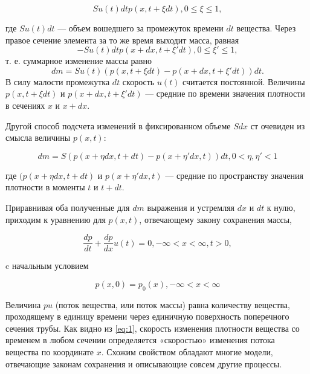 		
		\begin{equation}
		S u(t) dt p(x,t+ \xi dt), 0 \le  \xi  \le 1, 
		\end{equation}
		
		где $ S u(t) dt $ — объем вошедшего за 
		промежуток времени $ dt $ вещества. Через правое
		сечение элемента за то же время выходит масса, равная
		\begin{equation}
		 -Su(t)dtp(x+dx,t+\xi'dt), 0\le\xi'\le1,
		\end{equation}
		т. е. суммарное изменение массы равно
		\begin{equation}
		 dm = S u(t) (p(x,t+ \xi  dt)-p(x+dx,t+ \xi ' dt)) dt.
		\end{equation}
		В силу малости промежутка $ dt $ скорость $ u(t) $ считается постоянной. 
		Величины $ p(x,t+ \xi  dt) $ и $ p(x+dx,t+ \xi ' dt) $ — средние по времени значения
		плотности в сечениях $ x $ и $ x+dx $.
		
		Другой способ подсчета изменений в фиксированном объеме $ S dx $ ст
		очевиден из смысла величины $ p(x,t) $:
		
		\begin{equation} dm = S (p(x+ \eta dx,t+dt)-p(x+ \eta 'dx,t)) dt, 0< \eta , \eta '<1 \end{equation} 
		
		где $ (p(x+ \eta dx,t+dt) $ и $ p(x+ \eta 'dx,t) $ — средние по пространству 
		значения плотности в моменты $ t $ и $ t+dt $.
		
		Приравнивая оба полученные для $ dm $ выражения и устремляя $ dx $
		и $ dt $ к нулю, приходим к уравнению для $ p(x,t) $, отвечающему закону
		сохранения массы,
		
		\begin{equation} \frac{dp}{dt}+\frac{dp}{dx}u(t)=0, -\infty<x<\infty, t>0, \label{eq:1}\end{equation} 
		
		c начальным условием
		
		\begin{equation} p(x,0)=p_0(x), -\infty <x< \infty \label{eq:2}\end{equation} 
		
		Величина $ pu $ (поток вещества, или поток массы) равна 
		количеству вещества, проходящему в единицу времени через единичную
		поверхность поперечного сечения трубы. Как видно из \ref{eq:1}, скорость
		изменения плотности вещества со временем в любом сечении 
		определяется «скоростью» изменения потока вещества по координате $ x $.
		Схожим свойством обладают многие модели, отвечающие законам 
		сохранения и описывающие совсем другие процессы.
		
